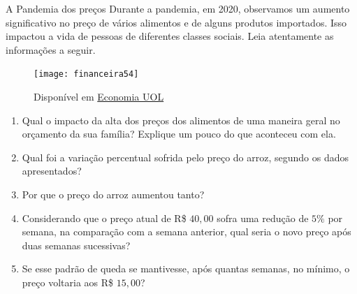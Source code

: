 \begin{task}{A Pandemia dos preços}
\label{fin-ativ-5}
Durante a pandemia, em 2020, observamos um aumento significativo no preço de vários alimentos e de alguns produtos importados. Isso impactou a vida de pessoas de diferentes classes sociais. Leia atentamente as informações a seguir.

\begin{figure}[H]
\centering

\texttt{[image: financeira54]}
\caption{Disponível em \href{https://economia.uol.com.br/noticias/redacao/2020/09/08/preco-do-arroz-dispara.html}{Economia UOL}}
\label{}
\end{figure}

\begin{enumerate}
\item Qual o impacto da alta dos preços dos alimentos de uma maneira geral no orçamento da sua família? Explique um pouco do que aconteceu com ela.
\item Qual foi a variação percentual sofrida pelo preço do arroz, segundo os dados apresentados?
\item Por que o preço do arroz aumentou tanto?
\item Considerando que o preço atual de R\$ $40{,}00$ sofra uma redução de $5\%$ por semana, na comparação com a semana anterior, qual seria o novo preço após duas semanas sucessivas?
\item Se esse padrão de queda se mantivesse, após quantas semanas, no mínimo, o preço voltaria aos R\$ $15{,}00$?
\end{enumerate}
\end{task}


